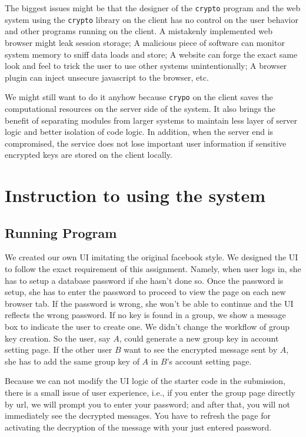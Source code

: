 The biggest issues might be that the designer of the \texttt{crypto} program and the web system using the \texttt{crypto} library on the client has no control on the user behavior and other programs running on the client. A mistakenly implemented web browser might leak session storage; A malicious piece of software can monitor system memory to sniff data loads and store; A website can forge the exact same look and feel to trick the user to use other systems unintentionally; A browser plugin can inject unsecure javascript to the browser, etc.

We might still want to do it anyhow because \texttt{crypo} on the client saves the computational resources on the server side of the system. It also brings the benefit of separating modules from larger systems to maintain less layer of server logic and better isolation of code logic. In addition, when the server end is compromised, the service does not lose important user information if sensitive encrypted keys are stored on the client locally.

\section{Instruction to using the system}

\subsection{Running Program}

We created our own UI imitating the original facebook style. We designed the UI to follow the exact requirement of this assignment. Namely, when user logs in, she has to setup a database password if she hasn't done so. Once the password is setup, she has to enter the password to proceed to view the page on each new browser tab. If the password is wrong, she won't be able to continue and the UI reflects the wrong password. If no key is found in a group, we show a message box to indicate the user to create one. 
We didn't change the workflow of group key creation. So the user, say $A$, could generate a new group key in account setting page. If the other user $B$ want to see the encrypted message sent by $A$, she has to add the same group key of $A$ in $B$'s account setting page. 

Because we can not modify the UI logic of the starter code in the submission, there is a small issue of user experience, i.e., if you enter the group page directly by url, we will prompt you to enter your password; and after that, you will not immediately see the decrypted messages. You have to refresh the page for activating the decryption of the message with your just entered password. 

